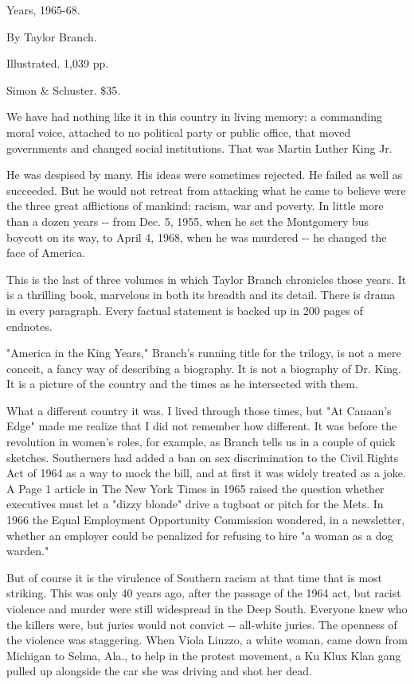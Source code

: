 Years, 1965-68.

By Taylor Branch.

Illustrated. 1,039 pp.

Simon \& Schuster. \$35.

We have had nothing like it in this country in living memory: a
commanding moral voice, attached to no political party or public office,
that moved governments and changed social institutions. That was Martin
Luther King Jr.

He was despised by many. His ideas were sometimes rejected. He failed as
well as succeeded. But he would not retreat from attacking what he came
to believe were the three great afflictions of mankind: racism, war and
poverty. In little more than a dozen years -\/- from Dec. 5, 1955, when
he set the Montgomery bus boycott on its way, to April 4, 1968, when he
was murdered -\/- he changed the face of America.

This is the last of three volumes in which Taylor Branch chronicles
those years. It is a thrilling book, marvelous in both its breadth and
its detail. There is drama in every paragraph. Every factual statement
is backed up in 200 pages of endnotes.

"America in the King Years," Branch's running title for the trilogy, is
not a mere conceit, a fancy way of describing a biography. It is not a
biography of Dr. King. It is a picture of the country and the times as
he intersected with them.

What a different country it was. I lived through those times, but "At
Canaan's Edge" made me realize that I did not remember how different. It
was before the revolution in women's roles, for example, as Branch tells
us in a couple of quick sketches. Southerners had added a ban on sex
discrimination to the Civil Rights Act of 1964 as a way to mock the
bill, and at first it was widely treated as a joke. A Page 1 article in
The New York Times in 1965 raised the question whether executives must
let a "dizzy blonde" drive a tugboat or pitch for the Mets. In 1966 the
Equal Employment Opportunity Commission wondered, in a newsletter,
whether an employer could be penalized for refusing to hire "a woman as
a dog warden."

But of course it is the virulence of Southern racism at that time that
is most striking. This was only 40 years ago, after the passage of the
1964 act, but racist violence and murder were still widespread in the
Deep South. Everyone knew who the killers were, but juries would not
convict -\/- all-white juries. The openness of the violence was
staggering. When Viola Liuzzo, a white woman, came down from Michigan to
Selma, Ala., to help in the protest movement, a Ku Klux Klan gang pulled
up alongside the car she was driving and shot her dead.

